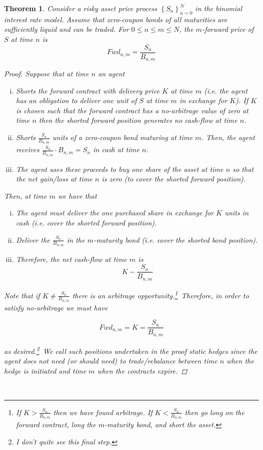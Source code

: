 \documentclass[12pt]{article}
\newtheorem{theorem}{Theorem}
\begin{document}
\begin{theorem} Consider a risky asset price process $\left\{S_n \right\}^N_{n = 0}$ in the binomial interest rate model. Assume that zero-coupon bonds of all maturities are sufficiently liquid and can be traded. For $0 \leq n \leq m \leq N$, the $m$-forward price of $S$ at time $n$ is
\begin{equation*}
	Fwd_{n,m} = \frac{S_n}{B_{n,m}}
\end{equation*}

\begin{proof} Suppose that at time $n$ an agent
\begin{enumerate}[(i)]
	\item Shorts the forward contract with delivery price $K$ at time $m$ (i.e. the agent has an obligation to deliver one unit of $S$ at time $m$ in exchange for $K$). If $K$ is chosen such that the forward contract has a no-arbitrage value of zero at time $n$ then the shorted forward position generates no cash-flow at time $n$.
	\item Shorts $\frac{S_n}{B_{n,m}}$ units of a zero-coupon bond maturing at time $m$. Then, the agent receives $\frac{S_n}{B_{n,m}} \cdot B_{n,m} = S_n$ in cash at time $n$.
	\item The agent uses these proceeds to buy one share of the asset at time $n$ so that the net gain/loss at time $n$ is zero (to cover the shorted forward position).
\end{enumerate}

Then, at time $m$ we have that
\begin{enumerate}[(i)]
	\item The agent must deliver the one purchased share in exchange for $K$ units in cash (i.e. cover the shorted forward position).
	\item Deliver the $\frac{S_n}{B_{n,m}}$ in the $m$-maturity bond (i.e. cover the shorted bond position).
	\item Therefore, the net cash-flow at time $m$ is
	\begin{equation*}
		K - \frac{ S_n }{ B_{n,m} }
	\end{equation*}
\end{enumerate} 

Note that if $K \neq \frac{S_n}{B_{n,m}}$ there is an arbitrage opportunity.\footnote{If $K > \frac{S_n}{B_{n,m}}$ then we have found arbitrage. If $K < \frac{S_n}{B_{n,m}}$ then go long on the forward contract, long the $m$-maturity bond, and short the asset.}~Therefore, in order to satisfy no-arbitrage we must have

\begin{equation*}
	Fwd_{n,m} = K = \frac{ S_n }{ B_{n,m} }
\end{equation*}

as desired.\footnote{I don't quite see this final step.}~We call such positions undertaken in the proof {\em static hedges} since the agent does not need (or should need) to trade/rebalance between time $n$ when the hedge is initiated and time $m$ when the contracts expire.

\end{proof}
\end{theorem} \hfill\\
\end{document}
